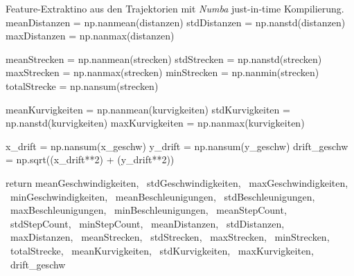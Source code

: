 \begin{pythoncodeAnhang}{Feature-Extraktino aus den Trajektorien mit \textit{Numba} just-in-time Kompilierung.}
    meanDistanzen = np.nanmean(distanzen)
    stdDistanzen = np.nanstd(distanzen)
    maxDistanzen = np.nanmax(distanzen)

    meanStrecken = np.nanmean(strecken)
    stdStrecken = np.nanstd(strecken)
    maxStrecken = np.nanmax(strecken)
    minStrecken = np.nanmin(strecken)
    totalStrecke = np.nansum(strecken)

    meanKurvigkeiten = np.nanmean(kurvigkeiten)
    stdKurvigkeiten = np.nanstd(kurvigkeiten)
    maxKurvigkeiten = np.nanmax(kurvigkeiten)

    x_drift = np.nansum(x_geschw)
    y_drift = np.nansum(y_geschw)
    drift_geschw = np.sqrt((x_drift**2) + (y_drift**2))

    return  meanGeschwindigkeiten, \
            stdGeschwindigkeiten, \
            maxGeschwindigkeiten, \
            minGeschwindigkeiten, \
            meanBeschleunigungen, \
            stdBeschleunigungen, \
            maxBeschleunigungen, \
            minBeschleunigungen, \
            meanStepCount, \
            stdStepCount, \
            minStepCount, \
            meanDistanzen, \
            stdDistanzen, \
            maxDistanzen, \
            meanStrecken, \
            stdStrecken, \
            maxStrecken, \
            minStrecken, \
            totalStrecke, \
            meanKurvigkeiten, \
            stdKurvigkeiten, \
            maxKurvigkeiten, \
            drift_geschw
\end{pythoncodeAnhang}